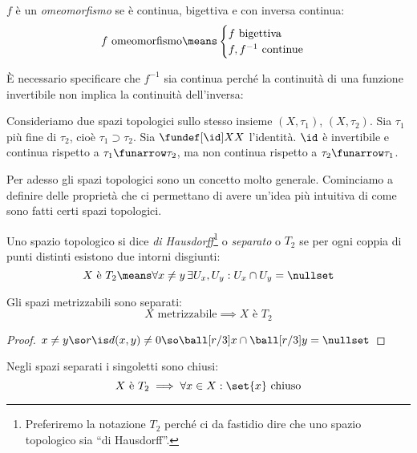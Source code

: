 \begin{defn}[Omeomorfismo]
	$f$ è un \emph{omeomorfismo} se è continua, bigettiva e con inversa continua:
	\[f\text{ omeomorfismo}\means
	\begin{cases}
		f\text{ bigettiva }\\
		f, f^{-1}\text{ continue}
	\end{cases}\]
\end{defn}

È necessario specificare che $f^{-1}$ sia continua perché la continuità di una funzione invertibile non implica la continuità dell'inversa:

\begin{es}
	Consideriamo due spazi topologici sullo stesso insieme $(X,\tau_1)$, $(X,\tau_2)$.
	Sia $\tau_1$ più fine di $\tau_2$, cioè $\tau_1\supset\tau_2$.
	Sia $\fundef[\id]XX$ l'identità.
	$\id$ è invertibile e continua rispetto a $\tau_1\funarrow\tau_2$,
	ma non continua rispetto a $\tau_2\funarrow\tau_1$.
\end{es}


Per adesso gli spazi topologici sono un concetto molto generale. Cominciamo a definire delle proprietà che ci permettano di avere un'idea più intuitiva di come sono fatti certi spazi topologici.

\begin{defn}
	Uno spazio topologico si dice \emph{di Hausdorff}\footnote{Preferiremo la notazione $T_2$ perché ci da fastidio dire che uno spazio topologico sia ``di Hausdorff''.} o \emph{separato} o \emph{$T_2$} se per ogni coppia di punti distinti esistono due intorni disgiunti:
	\[X\text{ è }T_2\means
	\forall x\neq y\,\exists U_x,U_y:U_x\cap U_y=\nullset\]
\end{defn}

\begin{prop}
	Gli spazi metrizzabili sono separati:
	\[X\text{ metrizzabile}\implies X\text{ è }T_2\]
\end{prop}

\begin{proof}
	$x\neq y\so r\is d(x,y)\neq 0\so\ball[r/3]x\cap\ball[r/3]y=\nullset$
\end{proof}

\begin{prop}
	Negli spazi separati i singoletti sono chiusi:
	\[X\text{ è }T_2\implies\forall x\in X:\set{x}\text{ chiuso}\]
\end{prop}

